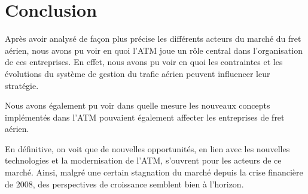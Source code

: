 \section*{Conclusion}


Après avoir analysé de façon plus précise les différents acteurs du marché du fret aérien, nous avons pu voir en quoi l'ATM joue un rôle central dans l'organisation de ces entreprises. En effet, nous avons pu voir en quoi les contraintes et les évolutions du système de gestion du trafic aérien peuvent influencer leur stratégie.


Nous avons également pu voir dans quelle mesure les nouveaux concepts implémentés dans l'ATM pouvaient également affecter les entreprises de fret aérien.


En définitive, on voit que de nouvelles opportunités, en lien avec les nouvelles technologies et la modernisation de l'ATM, s'ouvrent pour les acteurs de ce marché. Ainsi, malgré une certain stagnation du marché depuis la crise financière de 2008, des perspectives de croissance semblent bien à l'horizon.